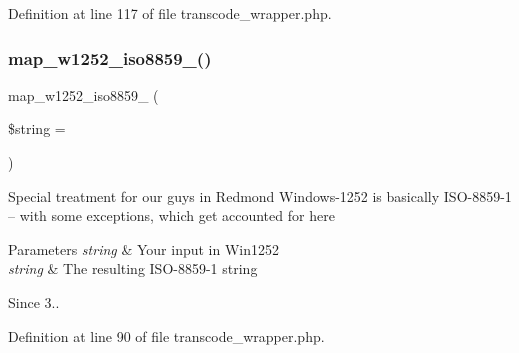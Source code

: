 Definition at line 117 of file transcode\+\_\+wrapper.\+php.

\mbox{\label{transcode__wrapper_8php_ab498abf492a3888848b6b0166994d801}} 
\subsubsection{\texorpdfstring{map\+\_\+w1252\+\_\+iso8859\+\_()}{map\_w1252\_iso8859\_1()}}
{\footnotesize\ttfamily map\+\_\+w1252\+\_\+iso8859\+\_ (\begin{DoxyParamCaption}\item[{}]{\$string = {\ttfamily \textquotesingle{}\textquotesingle{}} }\end{DoxyParamCaption})}

Special treatment for our guys in Redmond Windows-\/1252 is basically I\+S\+O-\/8859-\/1 -- with some exceptions, which get accounted for here 
\begin{DoxyParams}{Parameters}
{\em string} & Your input in Win1252 \\
\hline
{\em string} & The resulting I\+S\+O-\/8859-\/1 string \\
\hline
\end{DoxyParams}
\begin{DoxySince}{Since}
3.. 
\end{DoxySince}


Definition at line 90 of file transcode\+\_\+wrapper.\+php.

